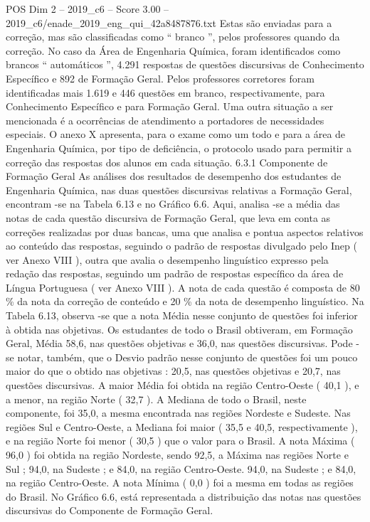 \begin{textsample}{POS Dim 2 – 2019\_c6 – Score 3.00 – 2019\_c6/enade\_2019\_eng\_qui\_42a8487876.txt}
Estas são enviadas para a correção, mas são classificadas como “ branco ”, pelos professores quando da correção.
No caso da Área de Engenharia Química, foram identificados como brancos “ automáticos ”, 4.291 respostas de questões discursivas de Conhecimento Específico e 892 de Formação Geral.
Pelos professores corretores foram identificadas mais 1.619 e 446 questões em branco, respectivamente, para Conhecimento Específico e para Formação Geral.
Uma outra situação a ser mencionada é a ocorrências de atendimento a portadores de necessidades especiais.
O anexo X apresenta, para o exame como um todo e para a área de Engenharia Química, por tipo de deficiência, o protocolo usado para permitir a correção das respostas dos alunos em cada situação. 6.3.1 Componente de Formação Geral As análises dos resultados de desempenho dos estudantes de Engenharia Química, nas duas questões discursivas relativas a Formação Geral, encontram -se na Tabela 6.13 e no Gráfico 6.6.
Aqui, analisa -se a média das notas de cada questão discursiva de Formação Geral, que leva em conta as correções realizadas por duas bancas, uma que analisa e pontua aspectos relativos ao conteúdo das respostas, seguindo o padrão de respostas divulgado pelo Inep ( ver Anexo VIII ), outra que avalia o desempenho linguístico expresso pela redação das respostas, seguindo um padrão de respostas específico da área de Língua Portuguesa ( ver Anexo VIII ).
A nota de cada questão é composta de 80 \% da nota da correção de conteúdo e 20 \% da nota de desempenho linguístico.
Na Tabela 6.13, observa -se que a nota Média nesse conjunto de questões foi inferior à obtida nas objetivas.
Os estudantes de todo o Brasil obtiveram, em Formação Geral, Média 58,6, nas questões objetivas e 36,0, nas questões discursivas.
Pode -se notar, também, que o Desvio padrão nesse conjunto de questões foi um pouco maior do que o obtido nas objetivas : 20,5, nas questões objetivas e 20,7, nas questões discursivas.
A maior Média foi obtida na região Centro-Oeste ( 40,1 ), e a menor, na região Norte ( 32,7 ).
A Mediana de todo o Brasil, neste componente, foi 35,0, a mesma encontrada nas regiões Nordeste e Sudeste.
Nas regiões Sul e Centro-Oeste, a Mediana foi maior ( 35,5 e 40,5, respectivamente ), e na região Norte foi menor ( 30,5 ) que o valor para o Brasil.
A nota Máxima ( 96,0 ) foi obtida na região Nordeste, sendo 92,5, a Máxima nas regiões Norte e Sul ; 94,0, na Sudeste ; e 84,0, na região Centro-Oeste. 94,0, na Sudeste ; e 84,0, na região Centro-Oeste.
A nota Mínima ( 0,0 ) foi a mesma em todas as regiões do Brasil.
No Gráfico 6.6, está representada a distribuição das notas nas questões discursivas do Componente de Formação Geral.

\end{textsample}
